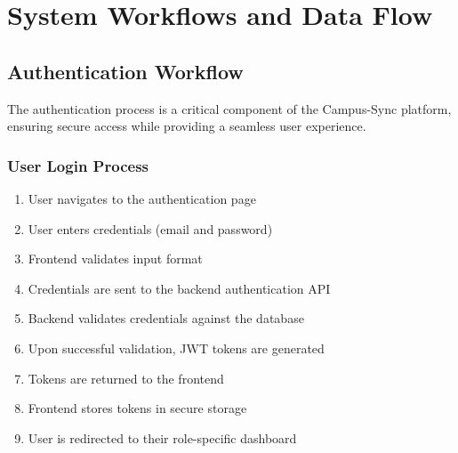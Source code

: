 \chapter{System Workflows and Data Flow}

\section{Authentication Workflow}

The authentication process is a critical component of the Campus-Sync platform, ensuring secure access while providing a seamless user experience.

\subsection{User Login Process}

\begin{enumerate}
    \item User navigates to the authentication page
    \item User enters credentials (email and password)
    \item Frontend validates input format
    \item Credentials are sent to the backend authentication API
    \item Backend validates credentials against the database
    \item Upon successful validation, JWT tokens are generated
    \item Tokens are returned to the frontend
    \item Frontend stores tokens in secure storage
    \item User is redirected to their role-specific dashboard
\end{enumerate}

